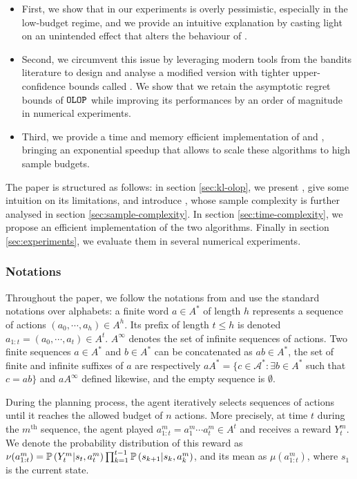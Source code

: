 \documentclass[runningheads]{llncs}
\newcommand{\citep}{\cite}
\begin{document}
\begin{itemize}
    \item First, we show that in our experiments \OLOP is overly pessimistic, especially in the low-budget regime, and we provide an intuitive explanation by casting light on an unintended effect that alters the behaviour of \OLOP.
    \item Second, we circumvent this issue by leveraging modern tools from the bandits literature to design and analyse a modified version with tighter upper-confidence bounds called \KLOLOP. We show that we retain the asymptotic regret bounds of $\texttt{OLOP}$ while improving its performances by an order of magnitude in numerical experiments.
    \item Third, we provide a time and memory efficient implementation of \OLOP and \KLOLOP, bringing an exponential speedup that allows to scale these algorithms to high sample budgets.
\end{itemize}

The paper is structured as follows: in section \ref{sec:kl-olop}, we present \OLOP, give some intuition on its limitations, and introduce \KLOLOP, whose sample complexity is further analysed in section \ref{sec:sample-complexity}. In section \ref{sec:time-complexity}, we propose an efficient implementation of the two algorithms. Finally in section \ref{sec:experiments}, we evaluate them in several numerical experiments.

\subsubsection{Notations}
Throughout the paper, we follow the notations from \citep{Bubeck2010} and use the standard notations over alphabets: a finite word $a \in A^*$ of length $h$ represents a sequence of actions $(a_0, \cdots, a_h) \in A^h$. Its prefix of length $t \leq h$ is denoted $a_{1:t} = (a_0,\cdots,a_t) \in A^t$. $A^\infty$ denotes the set of infinite sequences of actions. Two finite sequences $a\in A^*$ and $b\in A^*$ can be concatenated as $ab\in A^*$, the set of finite and infinite suffixes of $a$ are respectively $a A^* = \{c\in\mathcal{A}^*: \exists b\in A^*$ such that $c=ab\}$ and $aA^\infty$ defined likewise, and the empty sequence is $\emptyset$.

During the planning process, the agent iteratively selects sequences of actions until it reaches the allowed budget of $n$ actions. More precisely, at time $t$ during the $m^{\text{th}}$ sequence, the agent played $a^m_{1:t} = a^m_1 \cdots a^m_t \in A^t$ and receives a reward $Y_t^m$. We denote the probability distribution of this reward as $\nu(a_{1:t}^m) = \mathbb{P}\left(Y_t^m | s_t, a^m_t\right) \prod_{k=1}^{t-1} \mathbb{P}\left(s_{k+1} | s_{k}, a_{k}^m\right)$, and its mean as $\mu(a_{1:t}^m)$, where $s_1$ is the current state.
\end{document}
